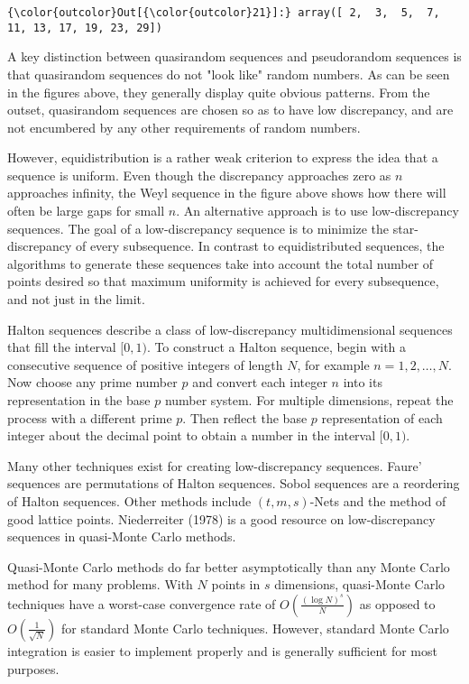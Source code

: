 \documentclass[11pt]{article}
\begin{document}
\begin{Verbatim}[commandchars=\\\{\}]
{\color{outcolor}Out[{\color{outcolor}21}]:} array([ 2,  3,  5,  7, 11, 13, 17, 19, 23, 29])
\end{Verbatim}
            
    A key distinction between quasirandom sequences and pseudorandom
sequences is that quasirandom sequences do not "look like" random
numbers. As can be seen in the figures above, they generally display
quite obvious patterns. From the outset, quasirandom sequences are
chosen so as to have low discrepancy, and are not encumbered by any
other requirements of random numbers.

However, equidistribution is a rather weak criterion to express the idea
that a sequence is uniform. Even though the discrepancy approaches zero
as \(n\) approaches infinity, the Weyl sequence in the figure above
shows how there will often be large gaps for small \(n\). An alternative
approach is to use low-discrepancy sequences. The goal of a
low-discrepancy sequence is to minimize the star-discrepancy of every
subsequence. In contrast to equidistributed sequences, the algorithms to
generate these sequences take into account the total number of points
desired so that maximum uniformity is achieved for every subsequence,
and not just in the limit.

Halton sequences describe a class of low-discrepancy multidimensional
sequences that fill the interval \([0,1)\). To construct a Halton
sequence, begin with a consecutive sequence of positive integers of
length \(N\), for example \(n=1,2,\ldots,N\). Now choose any prime
number \(p\) and convert each integer \(n\) into its representation in
the base \(p\) number system. For multiple dimensions, repeat the
process with a different prime \(p\). Then reflect the base \(p\)
representation of each integer about the decimal point to obtain a
number in the interval \([0,1)\).

Many other techniques exist for creating low-discrepancy sequences.
Faure' sequences are permutations of Halton sequences. Sobol sequences
are a reordering of Halton sequences. Other methods include
\((t,m,s)\)-Nets and the method of good lattice points. Niederreiter
(1978) is a good resource on low-discrepancy sequences in quasi-Monte
Carlo methods.

Quasi-Monte Carlo methods do far better asymptotically than any Monte
Carlo method for many problems. With \(N\) points in \(s\) dimensions,
quasi-Monte Carlo techniques have a worst-case convergence rate of
\(O \left( \frac{\left( \log N\right) ^s}{N} \right)\) as opposed to
\(O \left( \frac{1}{\sqrt{N}} \right)\) for standard Monte Carlo
techniques. However, standard Monte Carlo integration is easier to
implement properly and is generally sufficient for most purposes.
\end{document}

